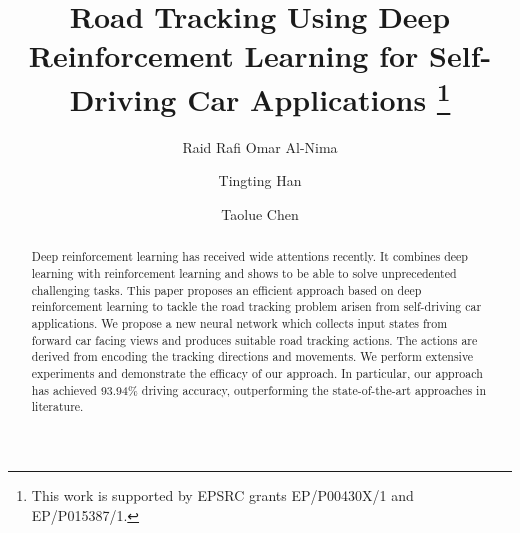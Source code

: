 \documentclass{svproc}
\begin{document}
	\mainmatter              %
	\title{Road Tracking Using Deep Reinforcement Learning for Self-Driving Car Applications
		\thanks{This work is supported by EPSRC grants EP/P00430X/1 and EP/P015387/1.}}
	\author{Raid Rafi Omar Al-Nima \and Tingting Han \and Taolue Chen}
	\maketitle               
	
	\begin{abstract}
		Deep reinforcement learning has received wide attentions recently. It combines deep learning with reinforcement learning and shows to be able to solve unprecedented challenging tasks. This paper proposes an efficient approach based on deep reinforcement learning to tackle the road tracking problem arisen from self-driving car applications. We propose a new neural network which collects input states from forward car facing views and produces suitable road tracking actions. The actions are derived from encoding the tracking directions and movements. 
		We perform extensive experiments and demonstrate the efficacy of our approach. In particular, our approach has achieved 93.94\% driving  accuracy, outperforming the state-of-the-art approaches in literature. 
		
	\end{abstract}
	
\end{document}
